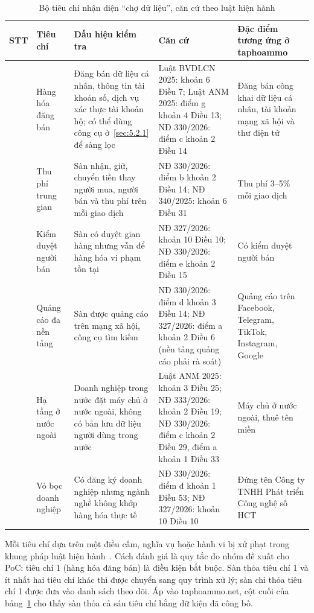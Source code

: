 {\small{}
\begin{table}[H]
\centering
\caption{Bộ tiêu chí nhận diện “chợ dữ liệu”, căn cứ theo luật hiện hành}\label{tab:5.11}
\begin{tabularx}{\textwidth}{>{\raggedright\arraybackslash}l>{\hsize=0.6\hsize\raggedright\arraybackslash}X>{\hsize=1.15\hsize\raggedright\arraybackslash}X>{\hsize=1.25\hsize\raggedright\arraybackslash}X>{\hsize=1.0\hsize\raggedright\arraybackslash}X}
\toprule
\textbf{STT} & \textbf{Tiêu chí} & \textbf{Dấu hiệu kiểm tra} & \textbf{Căn cứ} & \textbf{Đặc điểm tương ứng ở taphoammo} \\
\midrule
1 & Hàng hóa đăng bán & Đăng bán dữ liệu cá nhân, thông tin tài khoản số, dịch vụ xác thực tài khoản hộ; có thể dùng công cụ ở~\ref{sec:5.2.1} để sàng lọc & Luật BVDLCN 2025: khoản 6 Điều 7; Luật ANM 2025: điểm g khoản 4 Điều 13; NĐ 330/2026: điểm c khoản 2 Điều 14 & Đăng bán công khai dữ liệu cá nhân, tài khoản mạng xã hội và thư điện tử \\
2 & Thu phí trung gian & Sàn nhận, giữ, chuyển tiền thay người mua, người bán và thu phí trên mỗi giao dịch & NĐ 330/2026: điểm b khoản 2 Điều 14; NĐ 340/2025: khoản 6 Điều 31 & Thu phí 3--5\% mỗi giao dịch \\
3 & Kiểm duyệt người bán & Sàn có duyệt gian hàng nhưng vẫn để hàng hóa vi phạm tồn tại & NĐ 327/2026: khoản 10 Điều 10; NĐ 330/2026: điểm e khoản 2 Điều 15 & Có kiểm duyệt người bán \\
4 & Quảng cáo đa nền tảng & Sàn được quảng cáo trên mạng xã hội, công cụ tìm kiếm & NĐ 330/2026: điểm d khoản 3 Điều 14; NĐ 327/2026: điểm a khoản 2 Điều 6 (nền tảng quảng cáo phải rà soát) & Quảng cáo trên Facebook, Telegram, TikTok, Instagram, Google \\
5 & Hạ tầng ở nước ngoài & Doanh nghiệp trong nước đặt máy chủ ở nước ngoài, không có bản lưu dữ liệu người dùng trong nước & Luật ANM 2025: khoản 3 Điều 25; NĐ 333/2026: khoản 2 Điều 19; NĐ 330/2026: điểm c khoản 2 Điều 29, điểm a khoản 1 Điều 33 & Máy chủ ở nước ngoài, thuê tên miền \\
6 & Vỏ bọc doanh nghiệp & Có đăng ký doanh nghiệp nhưng ngành nghề không khớp hàng hóa thực tế & NĐ 330/2026: điểm đ khoản 1 Điều 53; NĐ 327/2026: khoản 10 Điều 10 & Đứng tên Công ty TNHH Phát triển Công nghệ số HCT \\
\bottomrule
\end{tabularx}
\end{table}}

Mỗi tiêu chí dựa trên một điều cấm, nghĩa vụ hoặc hành vi bị xử phạt trong khung pháp luật hiện hành~\cite{luat-anm-2025,luat-bvdlcn-2025,nd327-2026,nd330-2026,nd333-2026,nd340-2025}. Cách đánh giá là quy tắc do nhóm đề xuất cho PoC: tiêu chí 1 (hàng hóa đăng bán) là điều kiện bắt buộc. Sàn thỏa tiêu chí 1 và ít nhất hai tiêu chí khác thì được chuyển sang quy trình xử lý; sàn chỉ thỏa tiêu chí 1 được đưa vào danh sách theo dõi. Áp vào taphoammo.net, cột cuối của bảng~\ref{tab:5.11} cho thấy sàn thỏa cả sáu tiêu chí bằng dữ kiện đã công bố.

